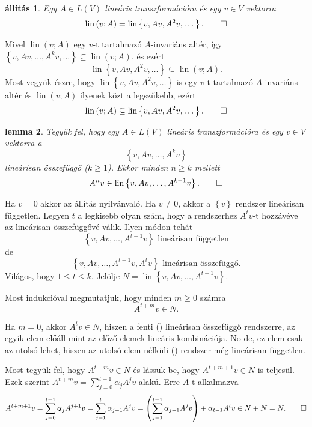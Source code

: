 \documentclass[a4paper, showtrims]{memoir}
\makeatletter
\renewenvironment{proof}[1][\proofname]
    {\par\pushQED{\qed}%
    \normalfont \topsep6\p@\@plus6\p@\relax
    \trivlist
    \item[\hskip\labelsep
        \itshape
    #1\@addpunct{:}]\ignorespaces}
    {\popQED\endtrivlist\@endpefalse}
\theoremstyle{plain}
\newtheorem{proposition}{állítás}[chapter]
\newtheorem{lemma}[proposition]{lemma}
\theoremstyle{remark}
\theoremstyle{definition}
\DeclareMathOperator{\lin}{lin}
\makeatother
\begin{document}
\begin{proposition}
	Egy $A\in L\left( V \right)$ lineáris transzformációra és egy $v\in V$ vektorra
	\[
		\lin\left( v;A \right)
		=
		\lin\left\{ v,Av,A^2v,\dots \right\}.\qedhere
	\]
\end{proposition}
\begin{proof}
	Mivel $\lin\left( v;A \right)$ egy $v$-t tartalmazó $A$-invariáns altér,
	így $\left\{ v,Av,\ldots,A^kv,\dots \right\}\subseteq \lin\left( v;A \right)$,
	és ezért
	\[
		\lin\left\{ v,Av,A^2v,\dots \right\}
		\subseteq
		\lin\left( v;A \right).
	\]
	Most vegyük észre, hogy
	\begin{math}
		\lin\left\{ v,Av,A^2v,\dots \right\}
	\end{math}
	is egy $v$-t tartalmazó $A$-invariáns altér és $\lin\left( v;A \right)$ ilyenek közt a legszűkebb, ezért
	\[
		\lin\left( v;A \right)
		\subseteq
		\lin\left\{ v,Av,A^2v,\dots \right\}.\qedhere
	\]
\end{proof}
\begin{lemma}
	Tegyük fel, hogy egy $A\in L\left( V \right)$ lineáris transzformációra és egy
	$v\in V$ vektorra a
	\[
		\left\{ v,Av,\ldots,A^kv \right\}
	\]
	lineárisan összefüggő ($k\geq 1$).
	Ekkor minden $n\geq k$ mellett
	\[
		A^nv\in\lin\left\{ v,Av,\ldots,A^{k-1}v \right\}.\qedhere
	\]
	\label{le:of}
\end{lemma}
\begin{proof}
	Ha $v=0$ akkor az állítás nyilvánvaló.
	Ha $v\neq 0$, akkor a $\left\{ v \right\}$ rendszer lineárisan független.
	Legyen $t$ a legkisebb olyan szám, hogy a rendszerhez $A^tv$-t hozzávéve az lineárisan összefüggővé válik.
	Ilyen módon tehát
	\[
		\left\{ v,Av,\ldots,A^{t-1}v \right\} \text{ lineárisan független}\tag{\dag}
	\]
	de
	\[
		\left\{ v,Av,\ldots,A^{t-1}v, A^tv \right\} \text{ lineárisan összefüggő.}\tag{\ddag}
	\]
	Világos, hogy $1\leq t\leq k$.
	Jelölje $N=\lin\left\{ v, Av,\ldots,A^{t-1}v \right\}$.

	Most indukcióval megmutatjuk, hogy minden $m\geq 0$ számra
	\[
		A^{t+m}v\in N.
	\]

	Ha $m=0$, akkor $A^tv\in N$, hiszen a fenti (\ddag) lineárisan összefüggő rendszerre,
	az egyik elem előáll mint az előző elemek lineáris kombinációja.
	No de, ez elem csak az utolsó lehet,
	hiszen az utolsó elem nélküli (\dag) rendszer még lineárisan független.

	Most tegyük fel, hogy $A^{t+m}v\in N$ és lássuk be, hogy $A^{t+m+1}v\in N$ is teljesül.
	Ezek szerint
	\begin{math}
		A^{t+m}v=\sum_{j=0}^{t-1}\alpha_jA^jv
	\end{math}
	alakú. Erre $A$-t alkalmazva
	\begin{displaymath}
		A^{t+m+1}v
		=
		\sum_{j=0}^{t-1}\alpha_jA^{j+1}v
		=
		\sum_{j=1}^{t}\alpha_{j-1}A^{j}v
		=
		\left( \sum_{j=1}^{t-1}\alpha_{ j-1}A^{j}v \right)+\alpha_{t-1}A^tv\in N+N=N.\qedhere
	\end{displaymath}
\end{proof}
\end{document}
